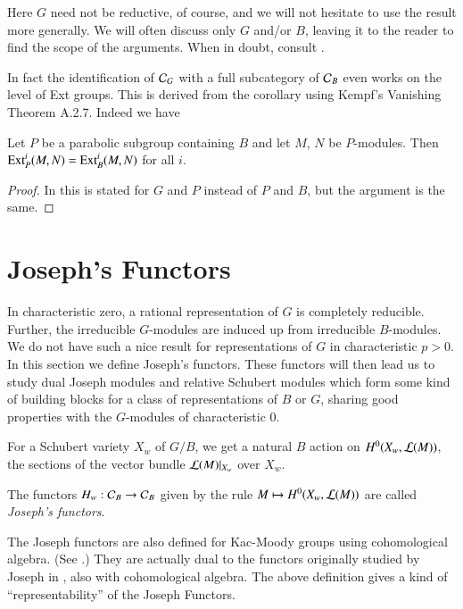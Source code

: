 \begin{remark}\label{chap2-rem2.1.9}
Here $G$ need not be reductive, of course, and we will not hesitate
to use the result more generally. We will often discuss only $G$
and/or $B$, leaving it to the reader to find the scope of the
arguments. When in doubt, consult \cite{key11}.
\end{remark}

In fact the identification of $\mathcal{C}_{G}$ with a full subcategory of
$\mathcal{C}_{B}$ even works on the level of Ext groups. This is derived from
the corollary using Kempf's Vanishing Theorem A.2.7. Indeed we have

\begin{lemma}\label{chap2-lem2.1.10}
Let $P$ be a parabolic subgroup containing $B$ and let $M$, $N$ be
$P$-modules. Then $\operatorname{Ext}^{i}_{P}(M,N)=\operatorname{Ext}^{i}_{B}(M,N)$ for all $i$.
\end{lemma}

\begin{proof}
In \cite[II Corollary 4.7]{key11} this is stated for $G$ and $P$
instead of $P$ and $B$, but the argument is the same.
\end{proof}

\section{Joseph's Functors}\label{chap2-sec2.2}\pageoriginale 
\label{page13}
In characteristic zero, a rational representation of $G$ is completely
reducible. Further, the irreducible $G$-modules are induced up from
irreducible $B$-modules. We do not have such a nice result for
representations of $G$ in characteristic $p>0$. In this section we
define Joseph's functors. These functors will then lead us to study
dual Joseph modules and relative Schubert modules which form some kind
of building blocks for a class of representations of $B$ or $G$,
sharing good properties with the $G$-modules of characteristic $0$.

For a Schubert variety $X_{w}$ of $G/B$, we get a natural $B$ action
on $H^{0}(X_{w},\mathcal{L}(M))$, the sections of the vector bundle
$\mathcal{L}(M)|_{X_{w}}$ over $X_{w}$.

\begin{definition}\label{chap2-defi2.2.1}
The functors $H_{w}:\mathcal{C}_{B}\to \mathcal{C}_{B}$ given by the rule $M\mapsto
H^{0}(X_{w},\mathcal{L}(M))$ are called {\em Joseph's functors}.
\end{definition}

\begin{remark}\label{chap2-rem2.2.2}
The Joseph functors are also defined for Kac-Moody groups using
cohomological algebra. (See \cite{key18}.) They are actually dual to
the functors originally studied by Joseph in \cite{key12}, also with
cohomological algebra. The above definition gives a kind of
``representability'' of the Joseph Functors.
\end{remark}


